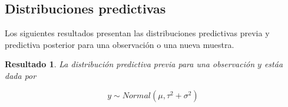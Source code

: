 \documentclass[
  10pt,
  spanish,
]{book}
\newtheorem{proposition}{Resultado}[chapter]
\theoremstyle{definition}
\theoremstyle{definition}
\theoremstyle{definition}
\theoremstyle{definition}
\theoremstyle{remark}
\begin{document}
\hypertarget{distribuciones-predictivas}{%
\subsection{Distribuciones predictivas}\label{distribuciones-predictivas}}

Los siguientes resultados presentan las distribuciones predictivas previa y predictiva posterior para una observación o una nueva muestra.

\begin{proposition}
\protect\hypertarget{prp:unnamed-chunk-69}{}{\label{prp:unnamed-chunk-69} }La distribución predictiva previa para una observación \(y\) estáa dada por

\begin{equation*}
y \sim Normal (\mu, \tau^2+\sigma^2)
\end{equation*}
\end{proposition}
\end{document}
